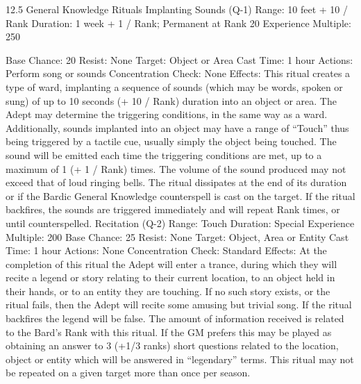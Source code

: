 \documentclass[a4paper]{article}
\begin{document}
\begin{multicols}{3}
12.5 General Knowledge Rituals
Implanting Sounds (Q-1)
Range: 10 feet + 10 / Rank
Duration: 1 week + 1 / Rank; Permanent at Rank
20
Experience Multiple: 250

Base Chance: 20%
Resist: None
Target: Object or Area
Cast Time: 1 hour
Actions: Perform song or sounds
Concentration Check: None
Effects: This ritual creates a type of ward, implanting a sequence of sounds (which may be words,
spoken or sung) of up to 10 seconds (+ 10 / Rank)
duration into an object or area. The Adept may
determine the triggering conditions, in the same
way as a ward. Additionally, sounds implanted into
an object may have a range of “Touch” thus being
triggered by a tactile cue, usually simply the object
being touched. The sound will be emitted each
time the triggering conditions are met, up to a
maximum of 1 (+ 1 / Rank) times. The volume of
the sound produced may not exceed that of loud
ringing bells. The ritual dissipates at the end of its
duration or if the Bardic General Knowledge counterspell is cast on the target. If the ritual backfires,
the sounds are triggered immediately and will
repeat Rank times, or until counterspelled.
Recitation (Q-2)
Range: Touch
Duration: Special
Experience Multiple: 200
Base Chance: 25%
Resist: None
Target: Object, Area or Entity
Cast Time: 1 hour
Actions: None
Concentration Check: Standard
Effects: At the completion of this ritual the Adept
will enter a trance, during which they will recite a
legend or story relating to their current location, to
an object held in their hands, or to an entity they
are touching. If no such story exists, or the ritual
fails, then the Adept will recite some amusing but
trivial song. If the ritual backfires the legend will
be false. The amount of information received is
related to the Bard’s Rank with this ritual. If the
GM prefers this may be played as obtaining an
answer to 3 (+1/3 ranks) short questions related to
the location, object or entity which will be answered in “legendary” terms. This ritual may not
be repeated on a given target more than once per
season.


\end{multicols}
\end{document}
